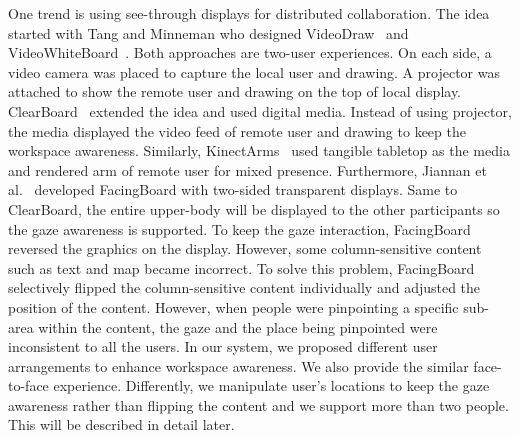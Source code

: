 \documentclass{sigchi}
\begin{document}
One trend is using see-through displays for distributed collaboration. The idea started with Tang and Minneman who designed VideoDraw~\cite{tang1990videodraw} and VideoWhiteBoard~\cite{tang1991videowhiteboard}. Both approaches are two-user experiences. On each side, a video camera was placed to capture the local user and drawing. A projector was attached to show the remote user and drawing on the top of local display. ClearBoard~\cite{ishii1992clearboard} extended the idea and used digital media. Instead of using projector, the media displayed the video feed of remote user and drawing to keep the workspace awareness. Similarly, KinectArms~\cite{genest2013kinectarms} used tangible tabletop as the media and rendered arm of remote user for mixed presence. Furthermore, Jiannan et al.~\cite{li2014interactive} developed FacingBoard with two-sided transparent displays. Same to ClearBoard, the entire upper-body will be displayed to the other participants so the gaze awareness is supported. To keep the gaze interaction, FacingBoard reversed the graphics on the display. However, some column-sensitive content such as text and map became incorrect. To solve this problem, FacingBoard selectively flipped the column-sensitive content individually and adjusted the position of the content. However, when people were pinpointing a specific sub-area within the content, the gaze and the place being pinpointed were inconsistent to all the users. In our system, we proposed different user arrangements to enhance workspace awareness. We also provide the similar face-to-face experience. Differently, we manipulate user's locations to keep the gaze awareness rather than flipping the content and we support more than two people. This will be described in detail later.
\end{document}
